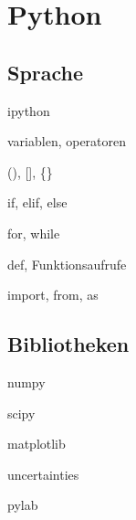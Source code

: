   \section{Python}
    \subsection{Sprache}
      \begin{frame}{ipython}
      \end{frame}
      
      \begin{frame}{variablen, operatoren}
      \end{frame}
      
      \begin{frame}{(), [], \{\}}
      \end{frame}
      
      \begin{frame}{if, elif, else}
      \end{frame}
      
      \begin{frame}{for, while}
      \end{frame}
      
      \begin{frame}{def, Funktionsaufrufe}
      \end{frame}
      
      \begin{frame}{import, from, as}
      \end{frame}
    
    \subsection{Bibliotheken}
      \begin{frame}{numpy}
      \end{frame}
      
      \begin{frame}{scipy}
      \end{frame}
      
      \begin{frame}{matplotlib}
      \end{frame}
      
      \begin{frame}{uncertainties}
      \end{frame}
      
      \begin{frame}{pylab}
      \end{frame}